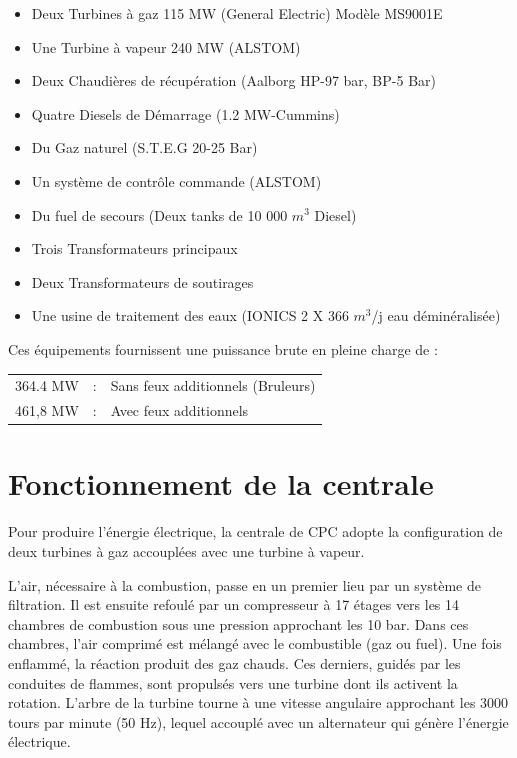 \begin{itemize}
\item Deux Turbines à gaz 115 MW (General Electric) Modèle MS9001E 
\item Une Turbine à vapeur 240 MW (ALSTOM)
\item 	Deux Chaudières de récupération (Aalborg HP-97 bar, BP-5 Bar)
\item 	Quatre Diesels de Démarrage (1.2 MW-Cummins)
\item 	Du Gaz naturel  (S.T.E.G 20-25 Bar)
\item 	Un système de contrôle commande (ALSTOM)
\item 	Du fuel de secours (Deux tanks de 10 000  \(m^3\)  Diesel)
\item 	Trois Transformateurs principaux
\item 	Deux Transformateurs de soutirages  
\item 	Une usine de traitement des eaux (IONICS 2 X 366 \(m^3\)/j eau déminéralisée)

\end{itemize} 

Ces équipements fournissent une puissance brute en pleine charge de :

\begin{tabular}{l c l}
364.4 MW &:& Sans feux additionnels (Bruleurs) \\
461,8 MW &:& Avec feux additionnels  %

\end{tabular}


\section{Fonctionnement de la centrale}
Pour produire l'énergie électrique, la centrale de CPC adopte la configuration de deux turbines à gaz accouplées avec une turbine à vapeur.

L'air, nécessaire à la combustion, passe en un premier lieu par un système de filtration. Il est ensuite refoulé par un compresseur à 17 étages vers les 14 chambres de combustion sous une pression approchant les 10 bar. Dans ces chambres, l'air comprimé est mélangé avec le combustible (gaz ou fuel). Une fois enflammé, la réaction produit des gaz chauds. Ces derniers, guidés par les conduites de flammes, sont propulsés vers une turbine dont ils activent la rotation.
L'arbre de la turbine tourne à une vitesse angulaire approchant les 3000 tours par minute (50 Hz), lequel accouplé avec un alternateur qui génère l'énergie électrique. 

